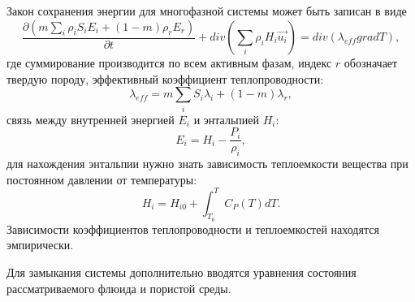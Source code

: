 Закон сохранения энергии для многофазной системы может быть записан в виде
\begin{equation}
\label{Energy_law}
  \frac{\partial \left(m {\sum\limits_{i}{\rho_i S_i E_i}} + (1-m){\rho_r E_r}\right)}{\partial t}
    + div(\sum_{i}{\rho_i H_i \overrightarrow{u_i}}) = div(\lambda_{eff} grad T),
\end{equation}
где суммирование производится по всем активным фазам, индекс $r$ обозначает твердую породу,
эффективный коэффициент теплопроводности:
\begin{equation}
\lambda_{eff}=m\sum_i{S_i\lambda_i} + (1-m)\lambda_r,
\end{equation}
связь между внутренней энергией $E_i$ и энтальпией $H_i$:
\begin{equation}
E_i=H_i-\frac{P_i}{\rho_i},
\end{equation} для нахождения энтальпии нужно знать зависимость теплоемкости
вещества при постоянном давлении от температуры:
\begin{equation}
H_i=H_{i0}+\int_{T_0}^{T}{C_P(T)dT}.
\end{equation}
Зависимости коэффициентов теплопроводности и теплоемкостей находятся эмпирически.

Для замыкания системы дополнительно вводятся уравнения состояния рассматриваемого флюида
и пористой среды.
